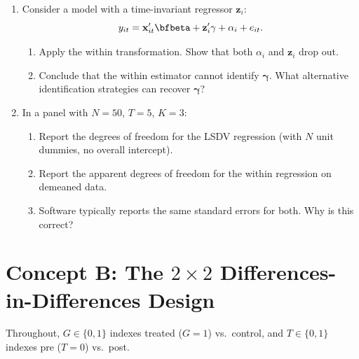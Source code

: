 \documentclass{article}
\begin{document}
\begin{enumerate}[label=\textbf{A.\arabic*},leftmargin=*,itemsep=10pt]
\item  Consider a model with a time-invariant regressor $\bm z_i$:
$$y_{it} = \bm x_{it}'\bfbeta + \bm z_i'\bm\gamma + \alpha_i + e_{it}.$$
\begin{enumerate}[label=(\alph*)]
  \item Apply the within transformation.  Show that both $\alpha_i$ and $\bm z_i$ drop out.
  \item Conclude that the within estimator cannot identify $\bm\gamma$.  What alternative identification strategies can recover $\bm\gamma$?
\end{enumerate}

\item  In a panel with $N = 50$, $T = 5$, $K = 3$:
\begin{enumerate}[label=(\alph*)]
  \item Report the degrees of freedom for the LSDV regression (with $N$ unit dummies, no overall intercept).
  \item Report the apparent degrees of freedom for the within regression on demeaned data.
  \item Software typically reports the same standard errors for both.  Why is this correct?
\end{enumerate}

\end{enumerate}

\bigskip

\section*{Concept B: The $2\times 2$ Differences-in-Differences Design}

Throughout, $G \in \{0, 1\}$ indexes treated ($G = 1$) vs.\ control, and $T \in \{0, 1\}$ indexes pre ($T = 0$) vs.\ post.
\end{document}
